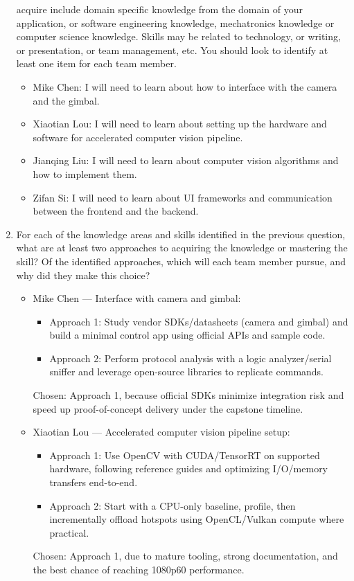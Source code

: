 \documentclass[12pt]{article}
\begin{document}
\begin{enumerate}
        acquire include domain specific knowledge from the domain of your application,
        or software engineering knowledge, mechatronics knowledge or computer science
        knowledge. Skills may be related to technology, or writing, or presentation, or
        team management, etc. You should look to identify at least one item for each
        team member.
        \begin{itemize}
          \item Mike Chen: I will need to learn about how to interface with the camera and the
                gimbal.
          \item Xiaotian Lou: I will need to learn about setting up the hardware and software
                for accelerated computer vision pipeline.
          \item Jianqing Liu: I will need to learn about computer vision algorithms and how to
                implement them.
          \item Zifan Si: I will need to learn about UI frameworks and communication between
                the frontend and the backend.
        \end{itemize}
  \item For each of the knowledge areas and skills identified in the previous question,
        what are at least two approaches to acquiring the knowledge or mastering the
        skill? Of the identified approaches, which will each team member pursue, and
        why did they make this choice?
        \begin{itemize}
          \item Mike Chen — Interface with camera and gimbal:
                \begin{itemize}
                  \item Approach 1: Study vendor SDKs/datasheets (camera and gimbal) and build a
                        minimal control app using official APIs and sample code.
                  \item Approach 2: Perform protocol analysis with a logic analyzer/serial sniffer and
                        leverage open-source libraries to replicate commands.
                \end{itemize}
                Chosen: Approach 1, because official SDKs minimize integration risk and speed up proof-of-concept delivery under the capstone timeline.

          \item Xiaotian Lou — Accelerated computer vision pipeline setup:
                \begin{itemize}
                  \item Approach 1: Use OpenCV with CUDA/TensorRT on supported hardware, following
                        reference guides and optimizing I/O/memory transfers end-to-end.
                  \item Approach 2: Start with a CPU-only baseline, profile, then incrementally offload
                        hotspots using OpenCL/Vulkan compute where practical.
                \end{itemize}
                Chosen: Approach 1, due to mature tooling, strong documentation, and the best chance of reaching 1080p60 performance.


\end{itemize}
\end{enumerate}
\end{document}
